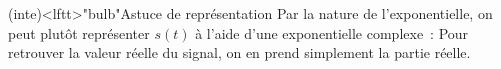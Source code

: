 \documentclass[../../main/main.tex]{subfiles}
\begin{document}
\begin{tcb}[sidebyside, righthand ratio=.3]
	(inte)<lftt>"bulb"{Astuce de représentation}
	Par la nature de l'exponentielle, on peut plutôt représenter $s(t)$ à l'aide
	d'une exponentielle complexe~:
	\psw{%
		\[
			\boxed{\xul{s}(t) = A \exr^{\jj(\wt+\f_0)}}
		\]
	}%
	Pour retrouver la valeur réelle du signal, on en prend simplement la partie
	réelle.
	\tcblower
	\begin{center}
		\vspace{-15pt}
	\end{center}
\end{tcb}
\end{document}
